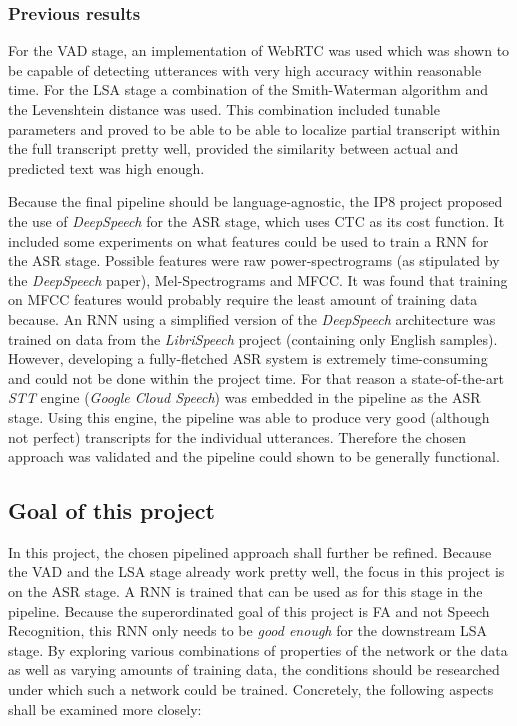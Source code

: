 \subsubsection{Previous results}
For the \ac{VAD} stage, an implementation of WebRTC was used which was shown to be capable of detecting utterances with very high accuracy within reasonable time. For the \ac{LSA} stage a combination of the Smith-Waterman algorithm and the Levenshtein distance was used. This combination included tunable parameters and proved to be able to be able to localize partial transcript within the full transcript pretty well, provided the similarity between actual and predicted text was high enough.

Because the final pipeline should be language-agnostic, the IP8 project proposed the use of \textit{DeepSpeech} for the \ac{ASR} stage, which uses \ac{CTC} \parencite{ctc_paper} as its cost function. It included some experiments on what features could be used to train a \ac{RNN} for the \ac{ASR} stage. Possible features were raw power-spectrograms (as stipulated by the \textit{DeepSpeech} paper), Mel-Spectrograms and \ac{MFCC}. It was found that training on \ac{MFCC} features would probably require the least amount of training data because. An \ac{RNN} using a simplified version of the \textit{DeepSpeech} architecture was trained on data from the \textit{LibriSpeech} project (containing only English samples). However, developing a fully-fletched ASR system is extremely time-consuming and could not be done within the project time. For that reason a state-of-the-art \textit{\ac{STT}} engine (\textit{Google Cloud Speech}) was embedded in the pipeline as the \ac{ASR} stage. Using this engine, the pipeline was able to produce very good (although not perfect) transcripts for the individual utterances. Therefore the chosen approach was validated and the pipeline could shown to be generally functional.

\subsection{Goal of this project}

In this project, the chosen pipelined approach shall further be refined. Because the \ac{VAD} and the \ac{LSA} stage already work pretty well, the focus in this project is on the \ac{ASR} stage. A \ac{RNN} is trained that can be used as for this stage in the pipeline. Because the superordinated goal of this project is \ac{FA} and not Speech Recognition, this RNN only needs to be \textit{good enough} for the downstream \ac{LSA} stage. By exploring various combinations of properties of the network or the data as well as varying amounts of training data, the conditions should be researched under which such a network could be trained. Concretely, the following aspects shall be examined more closely:

